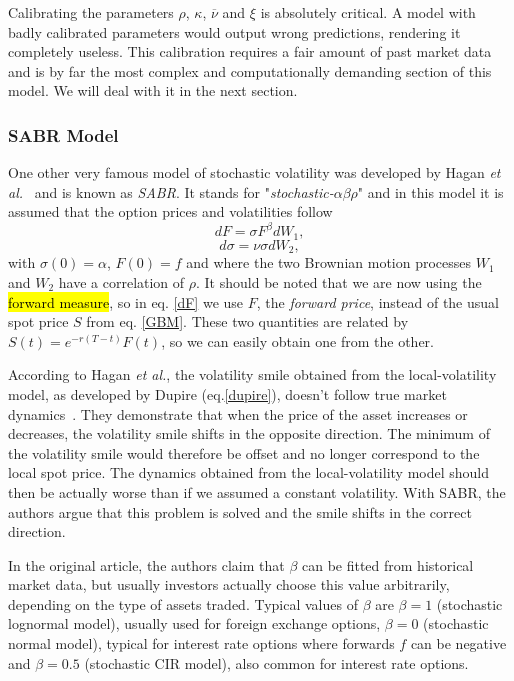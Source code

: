 Calibrating the parameters  $\rho$, $\kappa$, $\overline{\nu}$ and $\xi$ is absolutely critical. A model with badly calibrated parameters would output wrong predictions, rendering it completely useless.
This calibration requires a fair amount of past market data and is by far the most complex and computationally demanding section of this model. We will deal with it in the next section.


\subsubsection{SABR Model}
One other very famous model of stochastic volatility was developed by Hagan \textit{et al.}~\cite{Hagan} and is known as \emph{SABR}. It stands for "\emph{stochastic-}$\alpha\beta\rho$" and in this model it is assumed that the option prices and volatilities follow
\begin{equation}\label{dF}
dF=\sigma F^\beta dW_1,
\end{equation}
\begin{equation}
d\sigma=\nu\sigma dW_2,
\end{equation}
\noindent with $\sigma(0)=\alpha$, $F(0)=f$ and where the two Brownian motion processes $W_1$ and $W_2$ have a correlation of $\rho$. It should be noted that we are now using the \hl{forward measure}, so in eq. \eqref{dF} we use $F$, the \emph{forward price}, instead of the usual spot price $S$ from eq.  \ref{GBM}. These two quantities are related by $S(t)=e^{-r(T-t)}F(t)$, so we can easily obtain one from the other.

According to Hagan \textit{et al.}, the volatility smile obtained from the local-volatility model, as developed by Dupire (eq.\eqref{dupire}), doesn't follow true market dynamics~\cite{Hagan}. They demonstrate that when the price of the asset increases or decreases, the volatility smile shifts in the opposite direction. The minimum of the volatility smile would therefore be offset and no longer correspond to the local spot price. The dynamics obtained from the local-volatility model should then be actually worse than if we assumed a constant volatility. With SABR, the authors argue that this problem is solved and the smile shifts in the correct direction.

In the original article, the authors claim that $\beta$ can be fitted from historical market data, but usually investors actually choose this value arbitrarily, depending on the type of assets traded. Typical values of $\beta$ are $\beta=1$ (stochastic lognormal model), usually used for foreign exchange options, $\beta=0$ (stochastic normal model), typical for interest rate options where forwards $f$ can be negative and $\beta=0.5$ (stochastic CIR model), also common for interest rate options.

